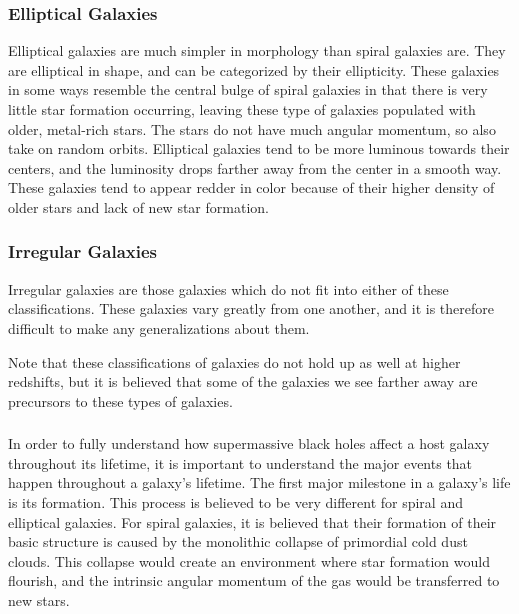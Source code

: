\documentclass[12pt]{article}
\begin{document}
    \subsubsection{Elliptical Galaxies}
    Elliptical galaxies are much simpler in morphology than spiral galaxies are.
    They are elliptical in shape, and can be categorized by their ellipticity.
    These galaxies in some ways resemble the central bulge of spiral galaxies in
    that there is very little star formation occurring, leaving these type of
    galaxies populated with older, metal-rich stars.  The stars do not have much
    angular momentum, so also take on random orbits.  Elliptical galaxies tend
    to be more luminous towards their centers, and the luminosity drops farther
    away from the center in a smooth way.  These galaxies tend to appear redder
    in color because of their higher density of older stars and lack of new star
    formation.

    \subsubsection{Irregular Galaxies}
    Irregular galaxies are those galaxies which do not fit into either of these
    classifications.  These galaxies vary greatly from one another, and it is
    therefore difficult to make any generalizations about them.

    Note that these classifications of galaxies do not hold up as well at higher
    redshifts, but it is believed that some of the galaxies we see farther away
    are precursors to these types of galaxies.

    \subsubsection*{}
    \vspace{-5mm}
    In order to fully understand how supermassive black holes affect a host
    galaxy throughout its lifetime, it is important to understand the major
    events that happen throughout a galaxy's lifetime.  The first major
    milestone in a galaxy's life is its formation.  This process is believed to
    be very different for spiral and elliptical galaxies.  For spiral galaxies,
    it is believed that their formation of their basic structure is caused by
    the monolithic collapse of primordial cold dust clouds.  This collapse would
    create an environment where star formation would flourish, and the intrinsic
    angular momentum of the gas would be transferred to new stars.
\end{document}

